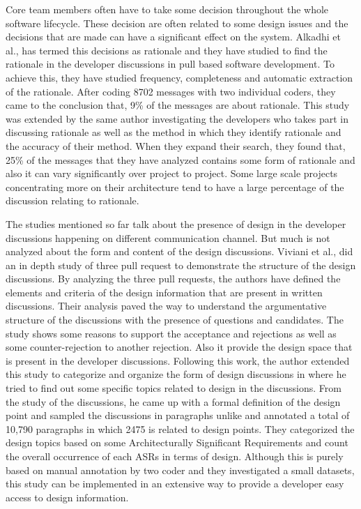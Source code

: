 Core team members often have to take some decision throughout the whole software lifecycle. These decision are often related to some design issues and the decisions that are made can have a significant effect on the system. Alkadhi et al.,\cite{Alkadhi2017} has termed this decisions as rationale and they have studied to find the rationale in the developer discussions in pull based software development. To achieve this, they have studied frequency, completeness and automatic extraction of the rationale. After coding 8702 messages with two individual coders, they came to the conclusion that, 9\% of the messages are about rationale. This study was extended by the same author \cite{Alkadhi2018} investigating the developers who takes part in discussing rationale as well as the method in which they identify rationale and the accuracy of their method. When they expand their search, they found that, 25\% of the messages that they have analyzed contains some form of rationale and also it can vary significantly over project to project. Some large scale projects concentrating more on their architecture tend to have a large percentage of the discussion relating to rationale.

The studies mentioned so far talk about the presence of design in the developer discussions happening on different communication channel. But much is not analyzed about the form and content of the design discussions. Viviani et al.,\cite{Viviani2018a} did an in depth study of three pull request to demonstrate the structure of the design discussions. By analyzing the three pull requests, the authors have defined the elements and criteria of the design information that are present in written discussions. Their analysis paved the way to understand the argumentative structure of the discussions with the presence of questions and candidates. The study shows some reasons to support the acceptance and rejections as well as some counter-rejection to another rejection. Also it provide the design space that is present in the developer discussions. Following this work, the author extended this study to categorize and organize the form of design discussions in \cite{Viviani2018} where he tried to find out some specific topics related to design in the discussions. From the study of the discussions, he came up with a formal definition of the design point and sampled the discussions in paragraphs unlike \cite{Brunet2014a} and annotated a total of 10,790 paragraphs in which 2475 is related to design points. They categorized the design topics based on some Architecturally Significant Requirements and count the overall occurrence of each ASRs in terms of design. Although this is purely based on manual annotation by two coder and they investigated a small datasets, this study can be implemented in an extensive way to provide a developer easy access to design information.   

 

